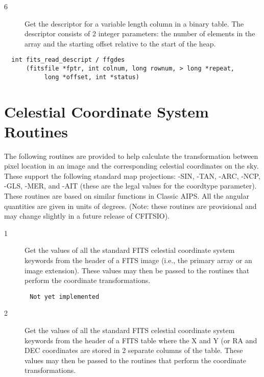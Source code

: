\begin{description}
\item[6 ] Get the descriptor for a variable length column in a binary table.
    The descriptor consists of 2 integer parameters: the number of elements
   in the array and the starting offset relative to the start of the heap.
\end{description}

\begin{verbatim}
  int fits_read_descript / ffgdes
      (fitsfile *fptr, int colnum, long rownum, > long *repeat,
           long *offset, int *status)
\end{verbatim}


\section{Celestial Coordinate System Routines \label{FFGICS}}

The following routines are provided to help calculate the
transformation between pixel location in an image and the corresponding
celestial coordinates on the sky.  These support the following standard
map projections:  -SIN, -TAN, -ARC, -NCP, -GLS, -MER, and -AIT (these
are the legal values for the coordtype parameter).  These routines are
based on similar functions in Classic AIPS.  All the angular quantities
are given in units of degrees. (Note: these routines are provisional
and may change slightly in a future release of CFITSIO).


\begin{description}
\item[1 ] Get the values of all the standard FITS celestial coordinate system
    keywords from the header of a FITS image (i.e., the primary array or
    an image extension).  These values may then be passed to the routines
   that perform the coordinate transformations.
\end{description}

\begin{verbatim}
       Not yet implemented
\end{verbatim}

\begin{description}
\item[2 ] Get the values of all the standard FITS celestial coordinate system
    keywords from the header of a FITS table where the X and Y (or RA and
    DEC coordinates are stored in 2 separate columns of the table.
    These values may then be passed to the routines that perform the
   coordinate transformations.
\end{description}


